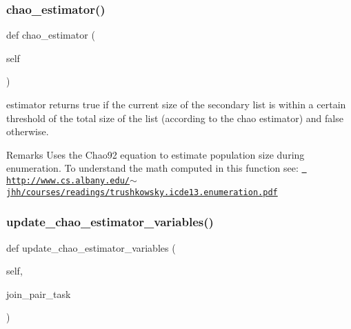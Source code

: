 \mbox{\label{classjoinapp_1_1models_1_1estimator_1_1_estimator_a582efaf16c8455e890ef61101a863966}} 
\subsubsection{\texorpdfstring{chao\_estimator()}{chao\_estimator()}}
{\footnotesize\ttfamily def chao\+\_\+estimator (\begin{DoxyParamCaption}\item[{}]{self }\end{DoxyParamCaption})}



estimator returns true if the current size of the secondary list is within a certain threshold of the total size of the list (according to the chao estimator) and false otherwise. 

\begin{DoxyRemark}{Remarks}
Uses the Chao92 equation to estimate population size during enumeration. To understand the math computed in this function see\+: \href{http://www.cs.albany.edu/~jhh/courses/readings/trushkowsky.icde13.enumeration.pdf}{\texttt{ http\+://www.\+cs.\+albany.\+edu/$\sim$jhh/courses/readings/trushkowsky.\+icde13.\+enumeration.\+pdf}} 
\end{DoxyRemark}
\mbox{\label{classjoinapp_1_1models_1_1estimator_1_1_estimator_aba71870a49baf189ad93170acd58d0de}} 
\subsubsection{\texorpdfstring{update\_chao\_estimator\_variables()}{update\_chao\_estimator\_variables()}}
{\footnotesize\ttfamily def update\+\_\+chao\+\_\+estimator\+\_\+variables (\begin{DoxyParamCaption}\item[{}]{self,  }\item[{}]{join\+\_\+pair\+\_\+task }\end{DoxyParamCaption})}



